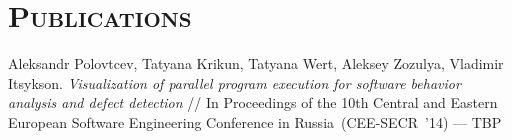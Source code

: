 \documentclass[12pt,a4paper]{moderncv}
\begin{document}

\section{\textsc{Publications}}
%
       {Aleksandr Polovtcev, Tatyana Krikun, Tatyana Wert, Aleksey Zozulya, Vladimir Itsykson.
\textit{Visualization of parallel program execution for software behavior analysis and defect detection}
        // In Proceedings of the 10th Central and Eastern European Software
        Engineering Conference in Russia~(CEE-SECR~'14)
        --- TBP}
\end{document}
